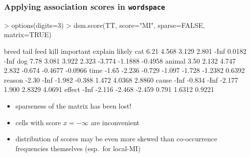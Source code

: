 \documentclass[t]{beamer} %
\begin{document}
\begin{frame}[fragile]
  \frametitle{Applying association scores in \texttt{wordspace}}

\ungap[1]
\begin{Rcode}
> options(digits=3) 
> dsm.score(TT, score="MI", sparse=FALSE, matrix=TRUE)\begin{Rout}
       breed   tail   feed   kill important explain  likely
cat     6.21  4.568  3.129  2.801      -Inf  0.0182    -Inf
dog     7.78  3.081  3.922  2.323    -3.774 -1.1888 -0.4958
animal  3.50  2.132  4.747  2.832    -0.674 -0.4677 -0.0966
time   -1.65 -2.236 -0.729 -1.097    -1.728 -1.2382  0.6392
reason -2.30   -Inf -1.982 -0.388     1.472  4.0368  2.8860
cause   -Inf -0.834   -Inf -2.177     1.900  2.8329  4.0691
effect  -Inf -2.116 -2.468 -2.459     0.791  1.6312  0.9221\end{Rout}
\end{Rcode}

\begin{itemize}
\item<2->[\hand] sparseness of the matrix has been lost!
\item<2->[\hand] cells with score $x = -\infty$ are inconvenient
\item<2->[\hand] distribution of scores may be even more skewed than co-occurrence frequencies themselves (esp.\ for local-MI)
\end{itemize}
\end{frame}
\end{document}
